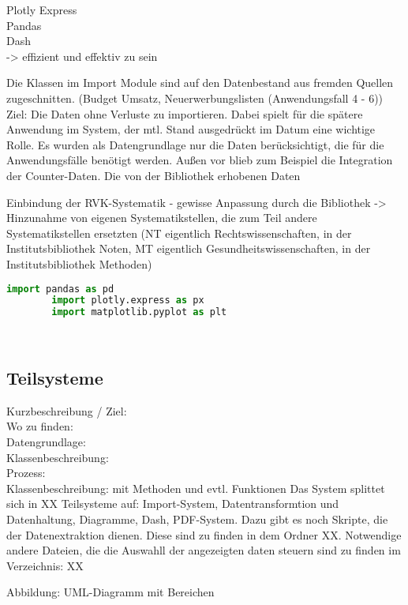     
    Plotly Express\\
    Pandas\\
    Dash\\
    -> effizient und effektiv zu sein


Die Klassen im Import Module sind auf den Datenbestand aus fremden Quellen zugeschnitten.
(Budget Umsatz, Neuerwerbungslisten (Anwendungsfall 4 - 6))
Ziel: Die Daten ohne Verluste zu importieren. Dabei spielt für die spätere Anwendung im System, der mtl. Stand
ausgedrückt im Datum eine wichtige Rolle.
Es wurden als Datengrundlage nur die Daten berücksichtigt, die für die Anwendungsfälle benötigt werden.
Außen vor blieb zum Beispiel die Integration der Counter-Daten.
Die von der Bibliothek erhobenen Daten

Einbindung der RVK-Systematik - gewisse Anpassung durch die Bibliothek -> Hinzunahme von eigenen Systematikstellen,
die zum Teil andere Systematikstellen ersetzten (NT eigentlich Rechtswissenschaften, in der Institutsbibliothek Noten, MT eigentlich
Gesundheitswissenschaften, in der Institutsbibliothek Methoden)

    \begin{lstlisting}[language=Python, caption=Python example]
        import pandas as pd
        import plotly.express as px
        import matplotlib.pyplot as plt

        
    \end{lstlisting}

    \subsection{Teilsysteme}
    
    Kurzbeschreibung / Ziel:\\
    Wo zu finden:\\
    Datengrundlage:\\
    Klassenbeschreibung:\\
    Prozess:\\
    
    Klassenbeschreibung: mit Methoden und evtl. Funktionen
    Das System splittet sich in XX Teilsysteme auf: Import-System, Datentransformtion und Datenhaltung, Diagramme, Dash, PDF-System. Dazu gibt es noch Skripte,
    die der Datenextraktion dienen. Diese sind zu finden in dem Ordner XX. Notwendige andere Dateien, die die Auswahll der angezeigten daten steuern sind zu finden im Verzeichnis: XX
    
    Abbildung: UML-Diagramm mit Bereichen
    

